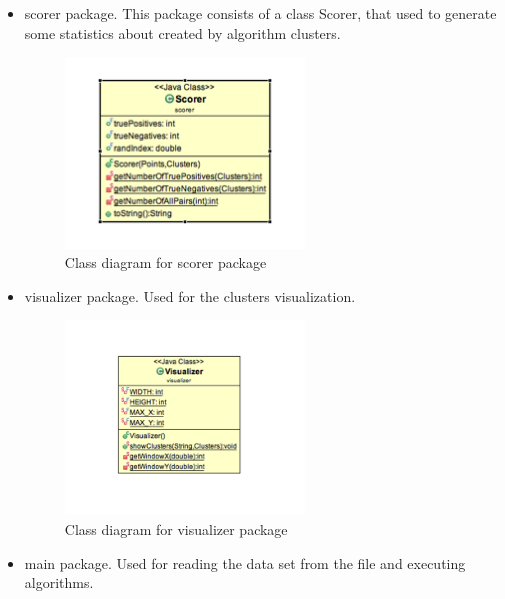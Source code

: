 \documentclass[12pt, a4paper, notitlepage, oneside]{article}
\begin{document}
\begin{itemize}
	\item scorer package. This package consists of a class Scorer, that used to generate some statistics about created by algorithm clusters.

	\begin{figure}[!ht]
 	\centering
	\includegraphics[width=0.6\textwidth]{images/scorer_package.png}
 	\caption[]
	{Class diagram for scorer package}
	\end{figure}

\item visualizer package. Used for  the clusters visualization.

	\begin{figure}[!ht]
 	\centering
	\includegraphics[width=0.6\textwidth]{images/visualizer_package.png}
 	\caption[]
	{Class diagram for visualizer package}
	\end{figure}

\item main package. Used for  reading the data set from the file and executing algorithms.


\end{itemize}
\end{document}
